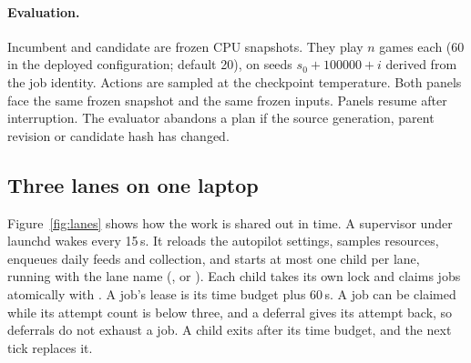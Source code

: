 \paragraph{Evaluation.} Incumbent and candidate are frozen CPU snapshots.
They play $n$ games each (60 in the deployed configuration; default 20), on
seeds $s_0+100000+i$ derived from the job identity. Actions are sampled at the
checkpoint temperature. Both panels face the same frozen  snapshot
and the same frozen inputs. Panels resume after interruption. The evaluator
abandons a plan if the source generation, parent revision or candidate hash
has changed.

\subsection{Three lanes on one laptop}
Figure~\ref{fig:lanes} shows how the work is shared out in time. A supervisor
under launchd  wakes every 15\,s. It reloads the autopilot
settings, samples resources, enqueues daily feeds and collection, and starts at
most one child per lane, running  with the
lane name (,  or ). Each child takes
its own lock and claims jobs atomically with . A job's
lease is its time budget plus 60\,s. A job can be claimed while its attempt
count is below three, and a deferral gives its attempt back, so deferrals do
not exhaust a job.
A child exits after its time budget, and the next tick replaces it.

